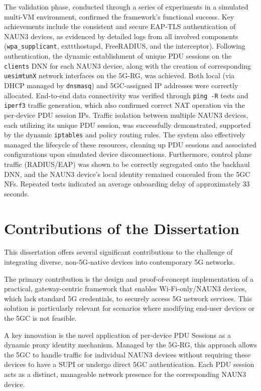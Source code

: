 The validation phase, conducted through a series of experiments in a simulated multi-\ac{VM} environment, confirmed the framework's functional success. Key achievements include the consistent and secure \ac{EAP-TLS} authentication of \ac{NAUN3} devices, as evidenced by detailed logs from all involved components (\texttt{wpa\_supplicant}, 	exttt{hostapd}, FreeRADIUS, and the interceptor). Following authentication, the dynamic establishment of unique \ac{PDU} sessions on the \texttt{clients} \ac{DNN} for each \ac{NAUN3} device, along with the creation of corresponding \texttt{uesimtunX} network interfaces on the \ac{5G-RG}, was achieved. Both local (via \ac{DHCP} managed by \texttt{dnsmasq}) and \ac{5GC}-assigned \ac{IP} addresses were correctly allocated. End-to-end data connectivity was verified through \texttt{ping -R} tests and \texttt{iperf3} traffic generation, which also confirmed correct \ac{NAT} operation via the per-device \ac{PDU} session \acp{IP}. Traffic isolation between multiple \ac{NAUN3} devices, each utilizing its unique \ac{PDU} session, was successfully demonstrated, supported by the dynamic \texttt{iptables} and policy routing rules. The system also effectively managed the lifecycle of these resources, cleaning up \ac{PDU} sessions and associated configurations upon simulated device disconnections. Furthermore, control plane traffic (\ac{RADIUS}/\ac{EAP}) was shown to be correctly segregated onto the backhaul \ac{DNN}, and the \ac{NAUN3} device's local identity remained concealed from the \ac{5GC} \acp{NF}. Repeated tests indicated an average onboarding delay of approximately 33 seconds.

\section{Contributions of the Dissertation}

This dissertation offers several significant contributions to the challenge of integrating diverse, non-\ac{5G}-native devices into contemporary \ac{5G} networks.

The primary contribution is the design and proof-of-concept implementation of a practical, gateway-centric framework that enables Wi-Fi-only/\ac{NAUN3} devices, which lack standard \ac{5G} credentials, to securely access \ac{5G} network services. This solution is particularly relevant for scenarios where modifying end-user devices or the \ac{5GC} is not feasible.

A key innovation is the novel application of per-device \ac{PDU} Sessions as a dynamic proxy identity mechanism. Managed by the \ac{5G-RG}, this approach allows the \ac{5GC} to handle traffic for individual \ac{NAUN3} devices without requiring these devices to have a \ac{SUPI} or undergo direct \ac{5GC} authentication. Each \ac{PDU} session acts as a distinct, manageable network presence for the corresponding \ac{NAUN3} device.

